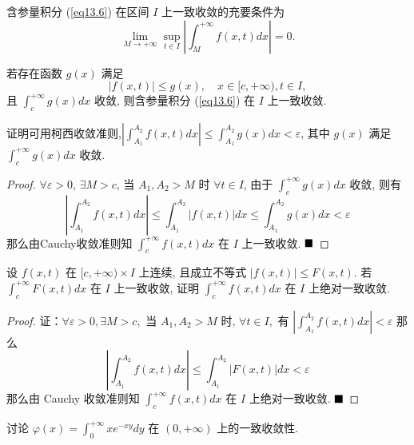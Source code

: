 \documentclass[lang=cn,newtx,10pt,scheme=chinese]{elegantbook}
\begin{document}
\begin{theorem}{\label{反常积分一致收敛的确界法}}
含参量积分 (\ref{eq13.6}) 在区间 $I$ 上一致收敛的充要条件为
$$ \lim\limits_{M \to +\infty} \sup_{t \in I} \left| \int_{M}^{+\infty} f(x,t) dx \right| = 0. $$
\end{theorem}

\begin{theorem}
若存在函数 $g(x)$ 满足
$$ |f(x,t)| \le g(x), \quad x \in [c, +\infty), t \in I, $$
且 $\int_{c}^{+\infty} g(x) dx$ 收敛, 则含参量积分 (\ref{eq13.6}) 在 $I$ 上一致收敛.
\end{theorem}
\begin{remark}
    证明可用柯西收敛准则,$|\int_{A_1}^{A_2} f(x,t) dx| \le \int_{A_1}^{A_2} g(x) dx < \varepsilon$, 其中 $g(x)$ 满足 $\int_{c}^{+\infty} g(x) dx$ 收敛.
\end{remark}

\begin{proof}
$\forall \varepsilon > 0$, $\exists M > c$, 当 $A_1, A_2 > M$ 时 $\forall t \in I$, 由于 $\int_c^{+\infty} g(x)dx$ 收敛, 则有
$$\left| \int_{A_1}^{A_2} f(x,t) dx \right| \le \int_{A_1}^{A_2} |f(x,t)| dx \le \int_{A_1}^{A_2} g(x) dx < \varepsilon$$
那么由Cauchy收敛准则知 $\int_c^{+\infty} f(x,t) dx$ 在 $I$ 上一致收敛.
$\hfill \blacksquare$
\end{proof}

\begin{example}
设 $f(x,t)$ 在 $[c, +\infty) \times I$ 上连续, 且成立不等式 $|f(x,t)| \le F(x,t)$. 若 $\int_{c}^{+\infty} F(x,t) dx$ 在 $I$ 上一致收敛, 证明 $\int_{c}^{+\infty} f(x,t) dx$ 在 $I$ 上绝对一致收敛.
\end{example}

\begin{proof}
证：$\forall \varepsilon > 0, \exists M > c,$ 当 $A_1, A_2 > M$ 时, $\forall t \in I,$ 有 $|\int_{A_1}^{A_2} f(x,t)dx| < \varepsilon$
那么
$$ \left| \int_{A_1}^{A_2} f(x,t)dx \right| \le \int_{A_1}^{A_2} |F(x,t)|dx < \varepsilon $$
那么由 Cauchy 收敛准则知 $\int_c^{+\infty} f(x,t) dx$ 在 $I$ 上绝对一致收敛.
$\hfill \blacksquare$
\end{proof}

\begin{example}{\label{ex13.2.2}}
讨论 $\varphi(x) = \int_{0}^{+\infty} xe^{-xy} dy$ 在 $(0, +\infty)$ 上的一致收敛性.
\end{example}
\end{document}
